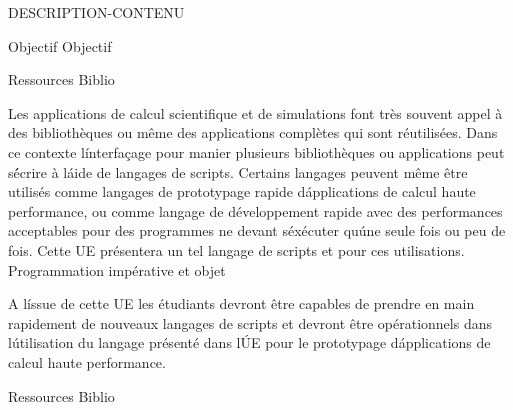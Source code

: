 \vfill

{
DESCRIPTION-CONTENU 
} 
{} 
{\begin{itemize}
\ObjItem Objectif 
\ObjItem Objectif
\end{itemize} 
} 
{Ressources} 
{Biblio} 
 
\vfill

{
Les applications de calcul scientifique et de simulations font très souvent appel à des bibliothèques ou même des applications complètes qui sont réutilisées. Dans ce contexte l\'interfaçage pour manier plusieurs bibliothèques ou applications peut s\'écrire à l\'aide de langages de scripts. Certains langages peuvent même être utilisés comme langages de prototypage rapide d\'applications de calcul haute performance, ou comme langage de développement rapide avec des performances acceptables pour des programmes ne devant s\'exécuter qu\'une seule fois ou peu de fois. Cette UE présentera un tel langage de scripts et pour ces utilisations. 
} 
{Programmation impérative et objet} 
{\begin{itemize}
\ObjItem A l\'issue de cette UE les étudiants devront être capables de prendre en main rapidement de nouveaux langages de scripts et devront être opérationnels dans l\'utilisation du langage présenté dans l\'UE pour le prototypage d\'applications de calcul haute performance. 

\end{itemize} 
} 
{Ressources} 
{Biblio} 
 
